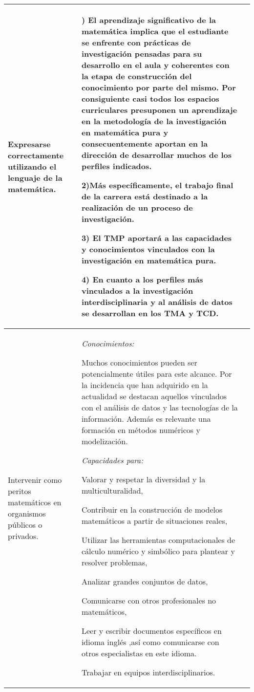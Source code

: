 \documentclass[a4paper, 12pt]{article}
\begin{document}
\begin{center}
\begin{xltabular}{1.0\textwidth}{|>{\raggedright\arraybackslash}X |
>{\raggedright\arraybackslash}X |
>{\raggedright\arraybackslash}X |
}
Expresarse correctamente utilizando el lenguaje de la matemática.

  
  
  &  1) El aprendizaje significativo de la matemática implica que el estudiante se enfrente con prácticas de investigación pensadas para su desarrollo en el aula y coherentes con  la etapa de construcción del conocimiento por parte del mismo. Por consiguiente casi todos los espacios curriculares presuponen un aprendizaje en la metodología de la investigación en matemática pura y consecuentemente aportan en la dirección de desarrollar muchos de los perfiles indicados.
  
  2)Más específicamente, el trabajo final de la carrera está destinado a la realización de un proceso de investigación.
  
  3) El TMP aportará a las capacidades y conocimientos vinculados con la investigación en matemática pura. 
  
  4) En cuanto a los perfiles más vinculados a la investigación interdisciplinaria y al análisis de datos se desarrollan en los TMA y TCD. \\ \hline

 
 Intervenir como peritos matemáticos en organismos públicos o privados.

  &   
   \emph{Conocimientos:}
   
   Muchos conocimientos pueden ser potencialmente útiles para este alcance. Por la incidencia que han adquirido en la actualidad se destacan aquellos vinculados con el análisis de datos y las tecnologías de la información.  Además es relevante una formación en métodos numéricos y modelización.
   
   
   \emph{Capacidades para:}


 Valorar y respetar la diversidad y la multiculturalidad,

Contribuir en la construcción de modelos matemáticos a partir de
situaciones reales,

 Utilizar las herramientas computacionales de cálculo numérico y simbólico para plantear y resolver problemas,
 
 Analizar grandes conjuntos de datos,

 Comunicarse con otros profesionales no matemáticos,

  Leer y escribir  documentos específicos en idioma inglés ,así como comunicarse con otros especialistas en este idioma.
  
  Trabajar en equipos interdisciplinarios.


\end{xltabular}
\end{center}
\end{document}
